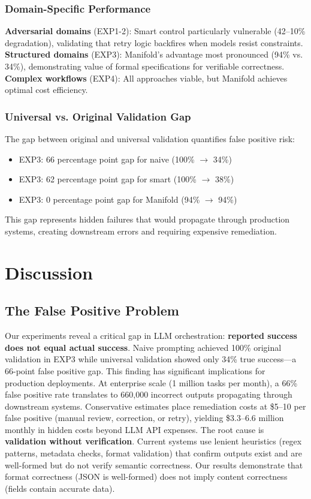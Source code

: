 \documentclass{article}
\begin{document}
\subsubsection{Domain-Specific Performance}
\textbf{Adversarial domains} (EXP1-2): Smart control particularly vulnerable (42--10\% degradation), validating that retry logic backfires when models resist constraints.
\textbf{Structured domains} (EXP3): Manifold's advantage most pronounced (94\% vs. 34\%), demonstrating value of formal specifications for verifiable correctness.
\textbf{Complex workflows} (EXP4): All approaches viable, but Manifold achieves optimal cost efficiency.

\subsubsection{Universal vs. Original Validation Gap}
The gap between original and universal validation quantifies false positive risk:
\begin{itemize}
\item EXP3: 66 percentage point gap for naive (100\% $\rightarrow$ 34\%)
\item EXP3: 62 percentage point gap for smart (100\% $\rightarrow$ 38\%)
\item EXP3: 0 percentage point gap for Manifold (94\% $\rightarrow$ 94\%)
\end{itemize}
This gap represents hidden failures that would propagate through production systems, creating downstream errors and requiring expensive remediation.

\section{Discussion}

\subsection{The False Positive Problem}
Our experiments reveal a critical gap in LLM orchestration: \textbf{reported success does not equal actual success}. Naive prompting achieved 100\% original validation in EXP3 while universal validation showed only 34\% true success---a 66-point false positive gap.
This finding has significant implications for production deployments. At enterprise scale (1 million tasks per month), a 66\% false positive rate translates to 660,000 incorrect outputs propagating through downstream systems. Conservative estimates place remediation costs at \$5--10 per false positive (manual review, correction, or retry), yielding \$3.3--6.6 million monthly in hidden costs beyond LLM API expenses.
The root cause is \textbf{validation without verification}. Current systems use lenient heuristics (regex patterns, metadata checks, format validation) that confirm outputs exist and are well-formed but do not verify semantic correctness. Our results demonstrate that format correctness (JSON is well-formed) does not imply content correctness (fields contain accurate data).
\end{document}
